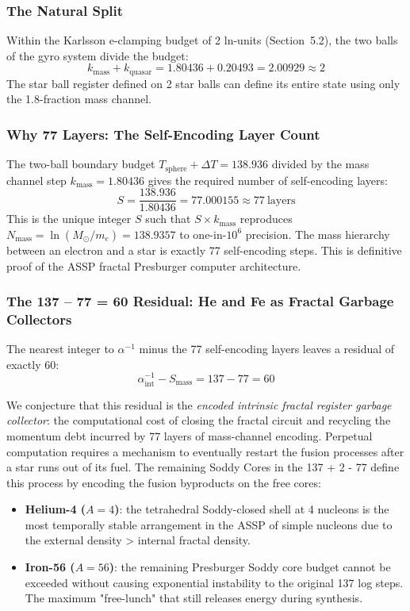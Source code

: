 \documentclass[11pt,a4paper]{article}
\begin{document}
\subsubsection{The Natural Split}

Within the Karlsson e-clamping budget of 2 ln-units (Section~5.2), the two balls
of the gyro system divide the budget:
\[
  k_{\text{mass}} + k_{\text{quasar}} = 1.80436 + 0.20493 = 2.00929 \approx 2
\]
The star ball register defined on 2 star balls can define its entire state using only the 1.8-fraction mass channel. 

\subsubsection{Why 77 Layers: The Self-Encoding Layer Count}

The two-ball boundary budget $T_{\text{sphere}} + \Delta T = 138.936$ divided by
the mass channel step $k_{\text{mass}} = 1.80436$ gives the required number of self-encoding layers:
\[
  S = \frac{138.936}{1.80436} = 77.000155 \approx \boxed{77\ \text{layers}}
\]
This is the unique integer $S$ such that $S \times k_{\text{mass}}$ reproduces
$N_{\text{mass}} = \ln(M_\odot/m_e) = 138.9357$ to one-in-$10^6$ precision. The mass hierarchy between an electron and a star is exactly 77 self-encoding steps. This is definitive proof of the ASSP fractal Presburger computer architecture.

\subsubsection{The 137 -- 77 = 60 Residual: He and Fe as Fractal Garbage Collectors}

The nearest integer to $\alpha^{-1}$ minus the 77 self-encoding layers leaves a
residual of exactly 60:
\[
  \alpha^{-1}_{\text{int}} - S_{\text{mass}} = 137 - 77 = \boxed{60}
\]

We conjecture that this residual is the \emph{encoded intrinsic fractal register garbage collector}: the computational cost of closing the fractal circuit and recycling the momentum debt incurred by 77 layers of mass-channel encoding. Perpetual computation requires a mechanism to eventually restart the fusion processes after a star runs out of its fuel. The remaining Soddy Cores in the 137 + 2 - 77 define this process by encoding the fusion byproducts on the free cores: 
\begin{itemize}
  \item \textbf{Helium-4 ($A = 4$)}: the tetrahedral Soddy-closed shell at 4 nucleons is the most temporally stable arrangement in the ASSP of simple nucleons due to the external density > internal fractal density.
  \item \textbf{Iron-56 ($A = 56$)}: the remaining Presburger Soddy core budget cannot be exceeded without causing exponential instability to the original 137 log steps. The maximum "free-lunch" that still releases energy during synthesis.
\end{itemize}
\end{document}
